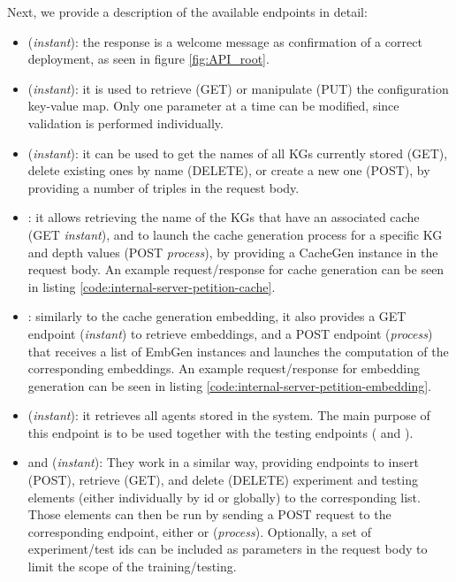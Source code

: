 

Next, we provide a description of the available endpoints in detail:

\begin{itemize}
    \item {} (\emph{instant}): the response is a welcome message as confirmation of a correct deployment, as seen in figure \ref{fig:API_root}.
    
    \item {} (\emph{instant}): it is used to retrieve (GET) or manipulate (PUT) the configuration key-value map. Only one parameter at a time can be modified, since validation is performed individually.

    \item {} (\emph{instant}): it can be used to get the names of all KGs currently stored (GET), delete existing ones by name (DELETE), or create a new one (POST), by providing a number of triples in the request body.

    \item {}: it allows retrieving the name of the KGs that have an associated cache (GET \emph{instant}), and to launch the cache generation process for a specific KG and depth values (POST \emph{process}), by providing a CacheGen instance in the request body. An example request/response for cache generation can be seen in listing \ref{code:internal-server-petition-cache}.
    \item {}: similarly to the cache generation embedding, it also provides a GET endpoint (\emph{instant}) to retrieve embeddings, and a POST endpoint (\emph{process}) that receives a list of EmbGen instances and launches the computation of the corresponding embeddings. An example request/response for  embedding generation can be seen in listing \ref{code:internal-server-petition-embedding}.

    \item {} (\emph{instant}): it retrieves all agents stored in the system. The main purpose of this endpoint is to be used together with the testing endpoints ( and ).
    \item {} and  (\emph{instant}): They work in a similar way, providing endpoints to insert (POST), retrieve (GET), and delete (DELETE) experiment and testing elements (either individually by id or globally) to the corresponding list. Those elements can then be run by sending a POST request to the corresponding endpoint, either  or  (\emph{process}). Optionally, a set of experiment/test ids can be included as parameters in the request body to limit the scope of the training/testing.


\end{itemize}
